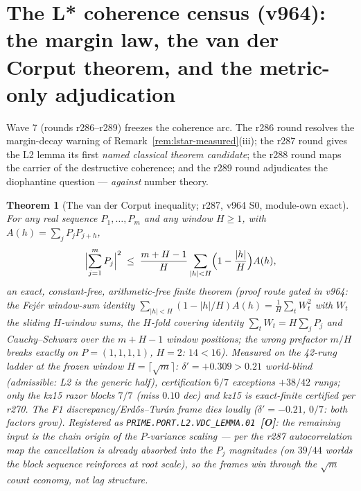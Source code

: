 \documentclass[11pt]{article}
\newcommand{\mO}{\textcolor{openred}{\textbf{[O]}}}
\newtheorem{theorem}{Theorem}[section]
\theoremstyle{definition}
\theoremstyle{remark}
\begin{document}
\section{The L* coherence census (v964): the margin law, the van der
Corput theorem, and the metric-only adjudication}\label{sec:coherence}

Wave 7 (rounds r286--r289) freezes the coherence arc.  The r286 round
resolves the margin-decay warning of
Remark~\ref{rem:lstar-measured}(iii); the r287 round gives the L2
lemma its first \emph{named classical theorem candidate}; the r288
round maps the carrier of the destructive coherence; and the r289
round adjudicates the diophantine question --- \emph{against} number
theory.

\begin{theorem}[The van der Corput inequality; r287, v964 S0,
module-own exact]\label{thm:vdc}
For any real sequence $P_1,\dots,P_m$ and any window $H\ge1$, with
$A(h)=\sum_jP_jP_{j+h}$,
\[
\Bigl|\sum_{j=1}^{m}P_j\Bigr|^{2}
\;\le\;
\frac{m+H-1}{H}\sum_{|h|<H}\Bigl(1-\frac{|h|}{H}\Bigr)A(h),
\]
an exact, constant-free, arithmetic-free finite theorem (proof route
gated in v964: the Fej\'er window-sum identity
$\sum_{|h|<H}(1-|h|/H)A(h)=\frac1H\sum_tW_t^2$ with $W_t$ the sliding
$H$-window sums, the $H$-fold covering identity $\sum_tW_t=H\sum_jP_j$
and Cauchy--Schwarz over the $m+H-1$ window positions; the wrong
prefactor $m/H$ breaks exactly on $P=(1,1,1,1)$, $H=2$: $14<16$).
Measured on the 42-rung ladder at the frozen window
$H=\lceil\sqrt m\rceil$: $\delta'=+0.309>0.21$ \emph{world-blind}
(admissible: L2 is the generic half), certification $6/7$ exceptions
$+38/42$ rungs; only the kz15 razor blocks $7/7$ (miss $0.10$ dec) and
kz15 is exact-finite certified per r270.  The F1
discrepancy/Erd\H{o}s--Tur\'an frame dies loudly ($\delta'=-0.21$,
$0/7$: both factors grow).  Registered as
\texttt{PRIME.PORT.L2.VDC\_LEMMA.01}~\mO: the remaining input is the
\emph{chain origin} of the $P$-variance scaling --- per the r287
autocorrelation map the cancellation is already absorbed into the
$P_j$ magnitudes (on $39/44$ worlds the block sequence
\emph{reinforces} at root scale), so the frames win through the
$\sqrt m$ count economy, not lag structure.
\end{theorem}
\end{document}
